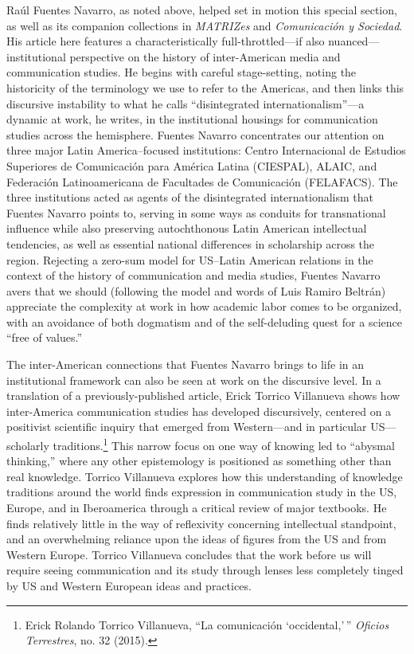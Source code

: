 \documentclass{tufte-handout}
\begin{document}
Raúl Fuentes Navarro, as noted above, helped set in motion this special
section, as well as its companion collections in \emph{MATRIZes} and
\emph{Comunicación y Sociedad}. His article here features a
characteristically full-throttled---if also nuanced---institutional
perspective on the history of inter-American media and communication
studies. He begins with careful stage-setting, noting the historicity of
the terminology we use to refer to the Americas, and then links this
discursive instability to what he calls ``disintegrated
internationalism''---a dynamic at work, he writes, in the institutional
housings for communication studies across the hemisphere. Fuentes
Navarro concentrates our attention on three major Latin America--focused
institutions: Centro Internacional de Estudios Superiores de
Comunicación para América Latina (CIESPAL), ALAIC, and Federación
Latinoamericana de Facultades de Comunicación (FELAFACS). The three
institutions acted as agents of the disintegrated internationalism that
Fuentes Navarro points to, serving in some ways as conduits for
transnational influence while also preserving autochthonous Latin
American intellectual tendencies, as well as essential national
differences in scholarship across the region. Rejecting a zero-sum model
for US--Latin American relations in the context of the history of
communication and media studies, Fuentes Navarro avers that we should
(following the model and words of Luis Ramiro Beltrán) appreciate the
complexity at work in how academic labor comes to be organized, with an
avoidance of both dogmatism and of the self-deluding quest for a science
``free of values.''

The inter-American connections that Fuentes Navarro brings to life in an
institutional framework can also be seen at work on the discursive
level. In a translation of a previously-published article, Erick Torrico
Villanueva shows how inter-America communication studies has developed
discursively, centered on a positivist scientific inquiry that emerged
from Western---and in particular US---scholarly traditions.\footnote{Erick
  Rolando Torrico Villanueva, ``La comunicación `occidental,'\,''
  \emph{Oficios Terrestres}, no. 32 (2015).} This narrow focus on one
way of knowing led to ``abysmal thinking,'' where any other epistemology
is positioned as something other than real knowledge. Torrico Villanueva
explores how this understanding of knowledge traditions around the world
finds expression in communication study in the US, Europe, and in
Iberoamerica through a critical review of major textbooks. He finds
relatively little in the way of reflexivity concerning intellectual
standpoint, and an overwhelming reliance upon the ideas of figures from
the US and from Western Europe. Torrico Villanueva concludes that the
work before us will require seeing communication and its study through
lenses less completely tinged by US and Western European ideas and
practices.~
\end{document}
